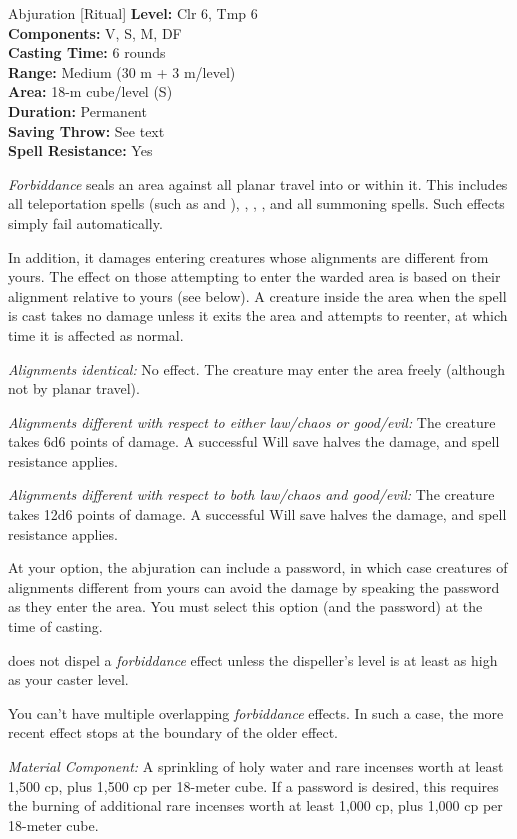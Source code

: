{Abjuration [Ritual]}
{
	\textbf{Level:}
	Clr 6, Tmp 6\\
	\textbf{Components:}
	V, S, M, DF\\
	\textbf{Casting Time:}
	6 rounds\\
	\textbf{Range:}
	Medium (30 m + 3 m/level)\\
	\textbf{Area:}
	18-m cube/level (S)\\
	\textbf{Duration:}
	Permanent\\
	\textbf{Saving Throw:}
	See text\\
	\textbf{Spell Resistance:}
	Yes\\
}
{
	\emph{Forbiddance} seals an area against all planar travel into or within it. This includes all teleportation spells (such as  and ), , , , and all summoning spells. Such effects simply fail automatically.

	In addition, it damages entering creatures whose alignments are different from yours. The effect on those attempting to enter the warded area is based on their alignment relative to yours (see below). A creature inside the area when the spell is cast takes no damage unless it exits the area and attempts to reenter, at which time it is affected as normal.

	\textit{Alignments identical:}
	No effect. The creature may enter the area freely (although not by planar travel).

	\textit{Alignments different with respect to either law/chaos or good/evil:}
	The creature takes 6d6 points of damage. A successful Will save halves the damage, and spell resistance applies.

	\textit{Alignments different with respect to both law/chaos and good/evil:}
	The creature takes 12d6 points of damage. A successful Will save halves the damage, and spell resistance applies.

	At your option, the abjuration can include a password, in which case creatures of alignments different from yours can avoid the damage by speaking the password as they enter the area. You must select this option (and the password) at the time of casting.

	 does not dispel a \emph{forbiddance} effect unless the dispeller's level is at least as high as your caster level.

	You can't have multiple overlapping \emph{forbiddance} effects. In such a case, the more recent effect stops at the boundary of the older effect.

	\textit{Material Component:}
	A sprinkling of holy water and rare incenses worth at least 1,500 cp, plus 1,500 cp per 18-meter cube. If a password is desired, this requires the burning of additional rare incenses worth at least 1,000 cp, plus 1,000 cp per 18-meter cube.

}
